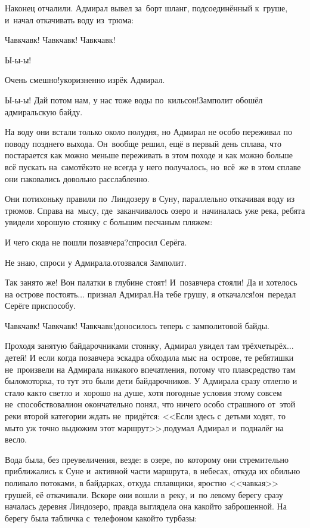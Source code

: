Наконец отчалили. Адмирал вывел за~борт шланг, подсоединённый к~груше, и~начал откачивать воду из~трюма:

\diagdash Чавк\sdash чавк! Чавк\sdash чавк! Чавк\sdash чавк!

\diagdash Ы-ы-ы!

\diagdash Очень смешно!\mdash укоризненно изрёк Адмирал.

\diagdash Ы-ы-ы! Дай потом нам, у нас тоже воды по~кильсон!\mdash Замполит обошёл адмиральскую байду.

На воду они встали только около полудня, но Адмирал не особо переживал по поводу позднего выхода. Он~вообще решил, ещё в первый день сплава, что постарается как можно меньше переживать в этом походе и как можно больше всё пускать на~самотёк\mdash это не всегда у него получалось, но~всё~же в этом сплаве они паковались довольно расслабленно.

Они потихоньку правили по~Линдозеру в Суну, параллельно откачивая воду из трюмов. Справа на~мысу, где~заканчивалось озеро и~начиналась уже река, ребята увидели хорошую стоянку с большим песчаным пляжем:

\diagdash И чего сюда не пошли позавчера?\mdash спросил Серёга.

\diagdash Не знаю, спроси у Адмирала.\mdash отозвался Замполит.

\diagdash Так занято же! Вон палатки в глубине стоят! И~позавчера стояли! Да и хотелось на острове постоять$\ldots$ \mdash признал Адмирал.\mdash На тебе грушу, я откачался!\mdash он~передал Серёге приспособу.

\diagdash Чавк\sdash чавк! Чавк\sdash чавк! Чавк\sdash чавк!\mdash доносилось теперь с замполитовой байды.

Проходя занятую байдарочниками стоянку, Адмирал увидел там трёх\sdash четырёх$\ldots$ детей! И если когда позавчера эскадра обходила мыс на~острове, те ребятишки не~произвели на Адмирала никакого впечатления, потому что плавсредство там было\mdash моторка, то тут это были дети байдарочников. У Адмирала сразу отлегло и стало как\sdash то светло и~хорошо на душе, хотя погодные условия этому совсем не~способствовали\mdash он окончательно понял, что ничего особо страшного от~этой реки второй категории ждать не~придётся: <<Если здесь с~детьми ходят, то мы\sdash то уж точно выдюжим этот маршрут>>,\mdash подумал Адмирал и~подналёг на весло.

Вода была, без преувеличения, везде: в озере, по~которому они стремительно приближались к Суне и~активной части маршрута, в небесах, откуда их обильно поливало потоками, в байдарках, откуда сплавщики, яростно <<чавкая>> грушей, её откачивали. Вскоре они вошли в~реку, и~по левому берегу сразу началась деревня Линдозеро, правда выглядела она какой\sdash то заброшенной. На берегу была табличка с~телефоном какой\sdash то турбазы:


